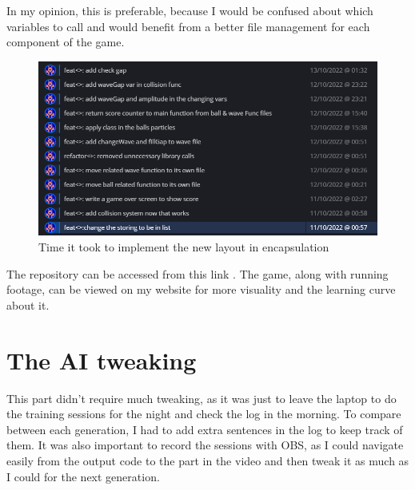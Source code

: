 In my opinion, this is preferable, because I would be confused about which variables to call and would benefit from a better file management for each component of the game.
\begin{figure}[H]
	\centering
	\includegraphics[width=0.7\linewidth]{usedImages/repoEncapsulation}
	\caption[]{Time it took to implement the new layout in encapsulation}
	\label{fig:repoencapsulation}
\end{figure}

The repository can be accessed from this link . The game, along with running footage, can be viewed on my website  for more visuality and the learning curve about it.

\section{The AI tweaking}

This part didn't require much tweaking, as it was just to leave the laptop to do the training sessions for the night and check the log in the morning. To compare between each generation, I had to add extra  sentences in the log to keep track of them. It was also important to record the sessions with OBS, as I could navigate easily from the output code to the part in the video and then tweak it as much as I could for the next generation.
